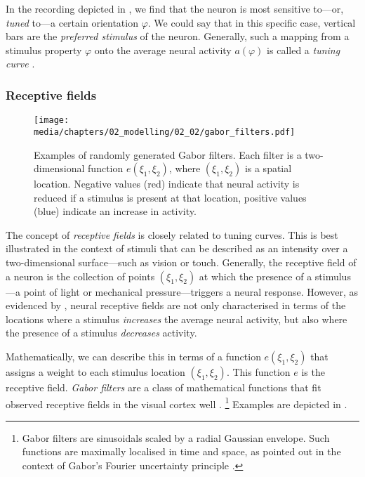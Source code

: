 In the recording depicted in , we find that the neuron is most sensitive to---or, \emph{tuned} to---a certain orientation $\varphi$.
We could say that in this specific case, vertical bars are the \emph{preferred stimulus} of the neuron.
Generally, such a mapping from a stimulus property $\varphi$ onto the average neural activity $a(\varphi)$ is called a \emph{tuning curve} \citep[e.g.,][p.~1112]{vandenbos2015apa}.

\subsubsection{Receptive fields}

\begin{figure}
	\centering
	\texttt{[image: media/chapters/02\_modelling/02\_02/gabor\_filters.pdf]}
	\caption[Examples of randomly generated of Gabor filters]{Examples of randomly generated Gabor filters.
	Each filter is a two-dimensional function $e(\xi_1, \xi_2)$, where $(\xi_1, \xi_2)$ is a spatial location.
	Negative  values (red) indicate that neural activity is reduced if a stimulus is present at that location, positive values (blue) indicate an increase in activity.}
	\label{fig:gabor}
\end{figure}
The concept of \emph{receptive fields} is closely related to tuning curves.
This is best illustrated in the context of stimuli that can be described as an intensity over a two-dimensional surface---such as vision or touch.
Generally, the receptive field of a neuron is the collection of points $(\xi_1, \xi_2)$ at which the presence of a stimulus---a point of light or mechanical pressure---triggers a neural response.
However, as evidenced by \citet{hubel1962receptive}, neural receptive fields are not only characterised in terms of the locations where a stimulus \emph{increases} the average neural activity, but also where the presence of a stimulus \emph{decreases} activity.

Mathematically, we can describe this in terms of a function $e(\xi_1, \xi_2)$ that assigns a weight to each stimulus location $(\xi_1, \xi_2)$.
This function $e$ is the receptive field.
\emph{Gabor filters} are a class of mathematical functions that fit observed receptive fields in the visual cortex well \citep{marcelja1980mathematical,field1986structure}.%
\footnote{Gabor filters are sinusoidals scaled by a radial Gaussian envelope. Such functions are maximally localised in time and space, as pointed out in the context of Gabor's Fourier uncertainty principle \citep{gabor1946theory}.}
Examples are depicted in .

